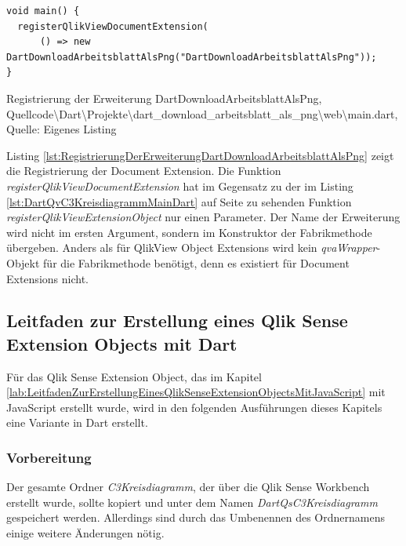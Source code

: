\ifIncludeFigures\begin{listing}[htbp]
\begin{verbatim}
void main() {  
  registerQlikViewDocumentExtension(
      () => new DartDownloadArbeitsblattAlsPng("DartDownloadArbeitsblattAlsPng"));
}
\end{verbatim}
\caption[Registrierung der Erweiterung DartDownloadArbeitsblattAlsPng]{Registrierung der Erweiterung DartDownloadArbeitsblattAlsPng, \\Quellcode\textbackslash{}Dart\textbackslash{}Projekte\textbackslash{}dart\_download\_arbeitsblatt\_als\_png\textbackslash{}web\textbackslash{}main.dart, \\Quelle: Eigenes Listing}
\label{lst:RegistrierungDerErweiterungDartDownloadArbeitsblattAlsPng}
\end{listing}\fi

Listing \ref{lst:RegistrierungDerErweiterungDartDownloadArbeitsblattAlsPng} zeigt die Registrierung der Document Extension. Die Funktion \textit{register\-QlikView\-Document\-Extension} hat im Gegensatz zu der im Listing \ref{lst:DartQvC3KreisdiagrammMainDart} auf Seite \pageref{lst:DartQvC3KreisdiagrammMainDart} zu sehenden Funktion \textit{register\-QlikView\-Extension\-Object} nur einen Parameter. Der Name der Erweiterung wird nicht im ersten Argument, sondern im Konstruktor der Fabrikmethode übergeben. Anders als für QlikView Object Extensions wird kein \textit{qvaWrapper}-Objekt für die Fabrikmethode benötigt, denn es existiert für Document Extensions nicht.


\subsection{Leitfaden zur Erstellung eines Qlik Sense Extension Objects mit Dart}

Für das Qlik Sense Extension Object, das im Kapitel \ref{lab:LeitfadenZurErstellungEinesQlikSenseExtensionObjectsMitJavaScript} mit JavaScript erstellt wurde, wird in den folgenden Ausführungen dieses Kapitels eine Variante in Dart erstellt.

\subsubsection{Vorbereitung}

Der gesamte Ordner \textit{C3Kreisdiagramm}, der über die Qlik Sense Workbench erstellt wurde, sollte kopiert und unter dem Namen \textit{Dart\-Qs\-C3\-Kreis\-diagramm} gespeichert werden. Allerdings sind durch das Umbenennen des Ordnernamens einige weitere Änderungen nötig.


